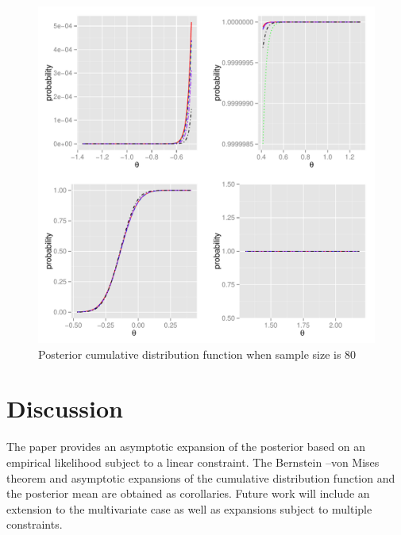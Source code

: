 \begin{figure}[H]

\begin{center}
\includegraphics[scale=0.5]{n80bw.pdf}\protect\caption{Posterior cumulative distribution function when sample size is 80\label{fig:Posterior-CDF-n80}}
\end{center}

\end{figure}
 
\section{Discussion}
The paper provides an asymptotic expansion of the posterior based on an empirical likelihood subject to a linear constraint. The Bernstein --von Mises theorem and asymptotic expansions of the cumulative distribution function and the posterior mean are obtained as corollaries. Future work will include an extension to the multivariate case as well as expansions subject to multiple constraints. 

